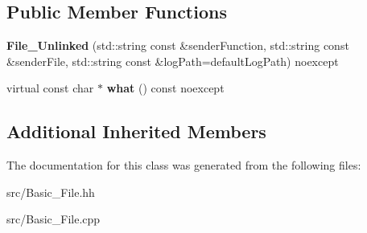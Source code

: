 \subsection*{Public Member Functions}
\begin{DoxyCompactItemize}
\item 
\hypertarget{classstb_1_1File__Unlinked_a82669ff7d647d11ae5877ad17fedd8a8}{{\bfseries File\+\_\+\+Unlinked} (std\+::string const \&sender\+Function, std\+::string const \&sender\+File, std\+::string const \&log\+Path=default\+Log\+Path) noexcept}\label{classstb_1_1File__Unlinked_a82669ff7d647d11ae5877ad17fedd8a8}

\item 
\hypertarget{classstb_1_1File__Unlinked_a126e2e92e7e91529b9adcbdc4f89ef7d}{virtual const char $\ast$ {\bfseries what} () const noexcept}\label{classstb_1_1File__Unlinked_a126e2e92e7e91529b9adcbdc4f89ef7d}

\end{DoxyCompactItemize}
\subsection*{Additional Inherited Members}


The documentation for this class was generated from the following files\+:\begin{DoxyCompactItemize}
\item 
src/Basic\+\_\+\+File.\+hh\item 
src/Basic\+\_\+\+File.\+cpp\end{DoxyCompactItemize}
